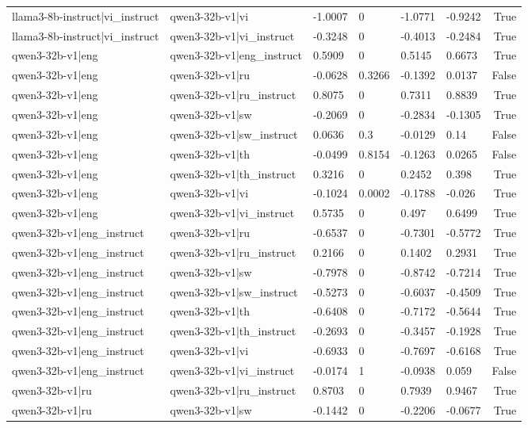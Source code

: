 \begin{table}
\begin{tabular}{llllllr}
llama3-8b-instruct|vi_instruct & qwen3-32b-v1|vi & -1.0007 & 0 & -1.0771 & -0.9242 & True \\
llama3-8b-instruct|vi_instruct & qwen3-32b-v1|vi_instruct & -0.3248 & 0 & -0.4013 & -0.2484 & True \\
qwen3-32b-v1|eng & qwen3-32b-v1|eng_instruct & 0.5909 & 0 & 0.5145 & 0.6673 & True \\
qwen3-32b-v1|eng & qwen3-32b-v1|ru & -0.0628 & 0.3266 & -0.1392 & 0.0137 & False \\
qwen3-32b-v1|eng & qwen3-32b-v1|ru_instruct & 0.8075 & 0 & 0.7311 & 0.8839 & True \\
qwen3-32b-v1|eng & qwen3-32b-v1|sw & -0.2069 & 0 & -0.2834 & -0.1305 & True \\
qwen3-32b-v1|eng & qwen3-32b-v1|sw_instruct & 0.0636 & 0.3 & -0.0129 & 0.14 & False \\
qwen3-32b-v1|eng & qwen3-32b-v1|th & -0.0499 & 0.8154 & -0.1263 & 0.0265 & False \\
qwen3-32b-v1|eng & qwen3-32b-v1|th_instruct & 0.3216 & 0 & 0.2452 & 0.398 & True \\
qwen3-32b-v1|eng & qwen3-32b-v1|vi & -0.1024 & 0.0002 & -0.1788 & -0.026 & True \\
qwen3-32b-v1|eng & qwen3-32b-v1|vi_instruct & 0.5735 & 0 & 0.497 & 0.6499 & True \\
qwen3-32b-v1|eng_instruct & qwen3-32b-v1|ru & -0.6537 & 0 & -0.7301 & -0.5772 & True \\
qwen3-32b-v1|eng_instruct & qwen3-32b-v1|ru_instruct & 0.2166 & 0 & 0.1402 & 0.2931 & True \\
qwen3-32b-v1|eng_instruct & qwen3-32b-v1|sw & -0.7978 & 0 & -0.8742 & -0.7214 & True \\
qwen3-32b-v1|eng_instruct & qwen3-32b-v1|sw_instruct & -0.5273 & 0 & -0.6037 & -0.4509 & True \\
qwen3-32b-v1|eng_instruct & qwen3-32b-v1|th & -0.6408 & 0 & -0.7172 & -0.5644 & True \\
qwen3-32b-v1|eng_instruct & qwen3-32b-v1|th_instruct & -0.2693 & 0 & -0.3457 & -0.1928 & True \\
qwen3-32b-v1|eng_instruct & qwen3-32b-v1|vi & -0.6933 & 0 & -0.7697 & -0.6168 & True \\
qwen3-32b-v1|eng_instruct & qwen3-32b-v1|vi_instruct & -0.0174 & 1 & -0.0938 & 0.059 & False \\
qwen3-32b-v1|ru & qwen3-32b-v1|ru_instruct & 0.8703 & 0 & 0.7939 & 0.9467 & True \\
qwen3-32b-v1|ru & qwen3-32b-v1|sw & -0.1442 & 0 & -0.2206 & -0.0677 & True \\

\end{tabular}
\end{table}

